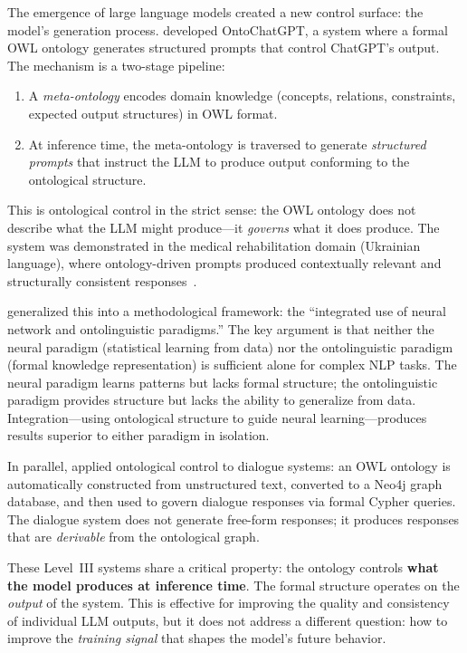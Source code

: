 \documentclass[11pt]{article}
\begin{document}
The emergence of large language models created a new control surface: the model's generation process.
\citet{palagin2023ontochatgpt} developed OntoChatGPT, a system where a formal OWL ontology generates structured prompts that control ChatGPT's output.
The mechanism is a two-stage pipeline:

\begin{enumerate}[nosep]
  \item A \emph{meta-ontology} encodes domain knowledge (concepts, relations, constraints, expected output structures) in OWL format.
  \item At inference time, the meta-ontology is traversed to generate \emph{structured prompts} that instruct the LLM to produce output conforming to the ontological structure.
\end{enumerate}

This is ontological control in the strict sense: the OWL ontology does not describe what the LLM might produce---it \emph{governs} what it does produce.
The system was demonstrated in the medical rehabilitation domain (Ukrainian language), where ontology-driven prompts produced contextually relevant and structurally consistent responses~\citep{palagin2023ontochatgpt}.

\citet{palagin2024neural} generalized this into a methodological framework: the ``integrated use of neural network and ontolinguistic paradigms.''
The key argument is that neither the neural paradigm (statistical learning from data) nor the ontolinguistic paradigm (formal knowledge representation) is sufficient alone for complex NLP tasks.
The neural paradigm learns patterns but lacks formal structure; the ontolinguistic paradigm provides structure but lacks the ability to generalize from data.
Integration---using ontological structure to guide neural learning---produces results superior to either paradigm in isolation.

In parallel, \citet{palagin2023dialogue} applied ontological control to dialogue systems: an OWL ontology is automatically constructed from unstructured text, converted to a Neo4j graph database, and then used to govern dialogue responses via formal Cypher queries.
The dialogue system does not generate free-form responses; it produces responses that are \emph{derivable} from the ontological graph.

These Level~III systems share a critical property: the ontology controls \textbf{what the model produces at inference time}.
The formal structure operates on the \emph{output} of the system.
This is effective for improving the quality and consistency of individual LLM outputs, but it does not address a different question: how to improve the \emph{training signal} that shapes the model's future behavior.
\end{document}

